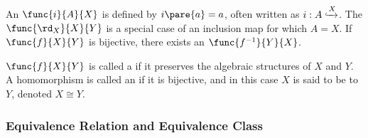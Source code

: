 \documentclass[hidelinks]{article}
\begin{document}
\par
An  $\func{i}{A}{X}$ is defined by $i\pare{a} = a$, often written as $i: A\xhookrightarrow X$. The  $\func{\rd_X}{X}{Y}$ is a special case of an inclusion map for which $A=X$. If $\func{f}{X}{Y}$ is bijective, there exists an  $\func{f^{-1}}{Y}{X}$.
\par
$\func{f}{X}{Y}$ is called a  if it preserves the algebraic structures of $X$ and $Y$. A homomorphism is called an  if it is bijective, and in this case $X$ is said to be  to $Y$, denoted $X \cong Y$. 


\subsubsection{Equivalence Relation and Equivalence Class} %
\label{ssub:equivalence_relation_and_equivalence_class}
\end{document}

